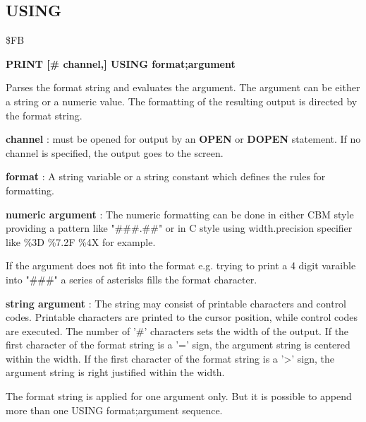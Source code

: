 \subsection{USING}
\begin{description}[leftmargin=2cm,style=nextline]
\item [Token:] \$FB
\item [Format:] {\bf PRINT [\# channel,] USING format;argument}
\item [Usage:]  Parses the format string and evaluates the argument.
                The argument can be either a string or a numeric value.
                The formatting of the resulting output is directed
                by the format string.

                {\bf channel} : must be opened for output by
                an {\bf OPEN} or {\bf DOPEN} statement.
                If no channel is specified, the output goes to the screen.

                {\bf format} : A string variable or a string constant
                which defines the rules for formatting.

                {\bf numeric argument} :
                The numeric formatting can be done in either
                CBM style providing a pattern like
                {\ttfamily "\#\#\#.\#\#"}
                or in C style using width.precision specifier like
                {\ttfamily \%3D \%7.2F \%4X } for example.

                If the argument does not fit into the format
                e.g. trying to print a 4 digit varaible into "\#\#\#"
                a series of asterisks fills the format character.

                {\bf string argument} : The string may consist of printable
                characters and control codes. Printable characters
                are printed to the cursor position, while control
                codes are executed.
                The number of '\#' characters sets the width of the output.
                If the first character of the format string
                is a '=' sign, the argument string is centered within
                the width.
                If the first character of the format string
                is a '>' sign, the argument string is right justified within
                the width.

\item [Remarks:] The format string is applied for one argument only.
                 But it is possible to append more than one
                 USING format;argument sequence.



\end{description}
